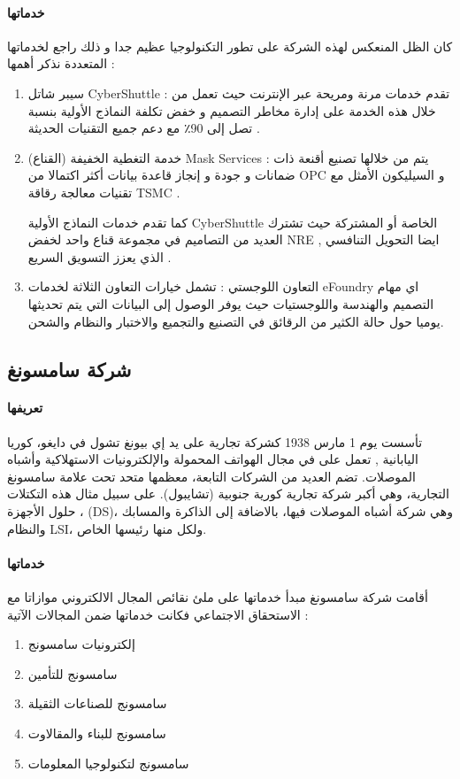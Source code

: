\paragraph{خدماتها} كان الظل المنعكس لهذه الشركة على تطور التكنولوجيا عظيم جدا و ذلك راجع لخدماتها المتعددة نذكر أهمها :
\begin{enumerate}
	\item 
	سيبر شاتل CyberShuttle :
	تقدم خدمات مرنة ومريحة عبر الإنترنت حيث تعمل من خلال هذه الخدمة على إدارة مخاطر التصميم و 	خفض تكلفة النماذج الأولية بنسبة تصل إلى 90٪ مع 	دعم جميع التقنيات الحديثة .
	
	\item 
	خدمة التغطية الخفيفة  (القناع)   Mask Services :
	يتم من خلالها تصنيع أقنعة ذات ضمانات و جودة و إنجاز قاعدة بيانات أكثر اكتمالا من OPC و السيليكون الأمثل مع تقنيات معالجة رقاقة TSMC . 
	
	كما تقدم خدمات النماذج الأولية CyberShuttle الخاصة أو المشتركة حيث تشترك العديد من التصاميم في مجموعة قناع واحد لخفض NRE , ايضا التحويل التنافسي الذي يعزز التسويق السريع .
	
	\item
	التعاون اللوجستي :  تشمل خيارات التعاون الثلاثة لخدمات eFoundry اي مهام التصميم والهندسة واللوجستيات حيث يوفر الوصول إلى البيانات التي يتم تحديثها يوميا حول حالة الكثير من الرقائق في التصنيع والتجميع والاختبار والنظام والشحن.
	
\end{enumerate}


\subsection{ شركة سامسونغ }

\paragraph{تعريفها}
تأسست يوم 1 مارس 1938 كشركة تجارية على يد إي بيونغ تشول في دايغو، كوريا اليابانية , تعمل على  في مجال الهواتف المحمولة والإلكترونيات الاستهلاكية وأشباه الموصلات. تضم العديد من الشركات التابعة، معظمها متحد تحت علامة سامسونغ التجارية، وهي أكبر شركة تجارية كورية جنوبية (تشايبول). على سبيل مثال هذه التكتلات ، حلول الأجهزة (DS)، وهي شركة أشباه الموصلات فيها، بالاضافة إلى الذاكرة والمسابك والنظام LSI، ولكل منها رئيسها الخاص.

\paragraph{خدماتها} أقامت شركة سامسونغ مبدأ خدماتها على ملئ نقائص المجال الالكتروني موازاتا مع الاستحقاق الاجتماعي فكانت خدماتها ضمن المجالات اﻵتية :
\begin{enumerate}
	\item
	إلكترونيات سامسونج
	\item
	سامسونج للتأمين
	\item
	سامسونج للصناعات الثقيلة
	\item
	سامسونج للبناء والمقالاوت
	\item
	سامسونج لتكنولوجيا المعلومات
\end{enumerate}

